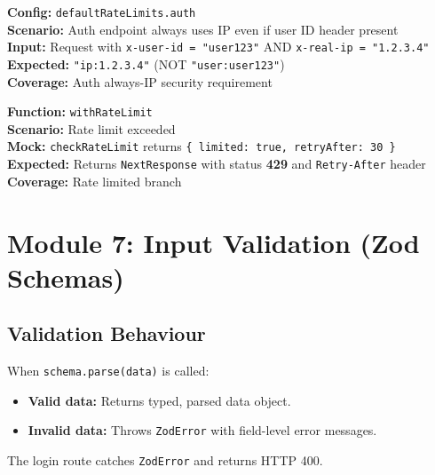 \documentclass[12pt,a4paper]{report}
\newcommand{\pone}{\textbf{\color{p1red}P1}}
\begin{document}
\begin{tcolorbox}[criticalbox, title={RATE-005 \hfill \pone\ --- Auth Always Uses IP}]
\textbf{Config:} \texttt{defaultRateLimits.auth} \\
\textbf{Scenario:} Auth endpoint always uses IP even if user ID header present \\
\textbf{Input:} Request with \texttt{x-user-id = "user123"} AND \texttt{x-real-ip = "1.2.3.4"} \\
\textbf{Expected:} \texttt{"ip:1.2.3.4"} (NOT \texttt{"user:user123"}) \\
\textbf{Coverage:} Auth always-IP security requirement
\end{tcolorbox}

\begin{tcolorbox}[testbox, title={RATE-007 \hfill \pone}]
\textbf{Function:} \texttt{withRateLimit} \\
\textbf{Scenario:} Rate limit exceeded \\
\textbf{Mock:} \texttt{checkRateLimit} returns \texttt{\{ limited: true, retryAfter: 30 \}} \\
\textbf{Expected:} Returns \texttt{NextResponse} with status \textbf{429} and \texttt{Retry-After} header \\
\textbf{Coverage:} Rate limited branch
\end{tcolorbox}

\chapter{Module 7: Input Validation (Zod Schemas)}

\section{Validation Behaviour}

\begin{tcolorbox}[infobox, title={Zod Schema Behaviour}]
When \texttt{schema.parse(data)} is called:
\begin{itemize}
  \item \textbf{Valid data:} Returns typed, parsed data object.
  \item \textbf{Invalid data:} Throws \texttt{ZodError} with field-level error messages.
\end{itemize}
The login route catches \texttt{ZodError} and returns HTTP 400.
\end{tcolorbox}
\end{document}
